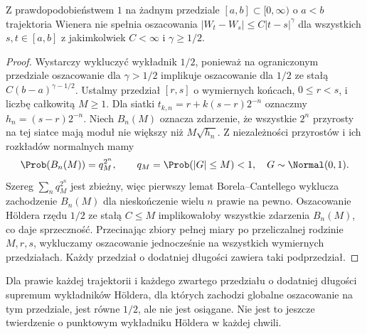 \begin{wniosek}
Z prawdopodobieństwem $1$ na żadnym przedziale
$[a,b]\subset[0,\infty)$ o $a<b$ trajektoria Wienera
nie spełnia oszacowania
$|W_t-W_s|\le C|t-s|^\gamma$ dla wszystkich $s,t\in[a,b]$
z jakimkolwiek $C<\infty$ i $\gamma\ge1/2$.
\end{wniosek}
\begin{proof}
Wystarczy wykluczyć wykładnik $1/2$, ponieważ
na ograniczonym przedziale oszacowanie dla $\gamma>1/2$
implikuje oszacowanie dla $1/2$ ze stałą
$C(b-a)^{\gamma-1/2}$.
Ustalmy przedział $[r,s]$ o wymiernych końcach,
$0\le r<s$, i liczbę całkowitą $M\ge1$.
Dla siatki $t_{k,n}=r+k(s-r)2^{-n}$ oznaczmy
$h_n=(s-r)2^{-n}$. Niech $B_n(M)$ oznacza zdarzenie,
że wszystkie $2^n$ przyrosty na tej siatce mają moduł
nie większy niż $M\sqrt{h_n}$. Z niezależności
przyrostów i ich rozkładów normalnych mamy
\[
\Prob(B_n(M))=q_M^{2^n},\qquad
q_M=\Prob(|G|\le M)<1,\quad G\sim\Normal(0,1).
\]
Szereg $\sum_n q_M^{2^n}$ jest zbieżny,
więc pierwszy lemat Borela--Cantellego wyklucza
zachodzenie $B_n(M)$ dla nieskończenie wielu $n$
prawie na pewno. Oszacowanie H\"oldera rzędu $1/2$
ze stałą $C\le M$ implikowałoby wszystkie zdarzenia
$B_n(M)$, co daje sprzeczność.
Przecinając zbiory pełnej miary po przeliczalnej
rodzinie $M,r,s$, wykluczamy oszacowanie jednocześnie
na wszystkich wymiernych przedziałach. Każdy przedział
o dodatniej długości zawiera taki podprzedział.
\end{proof}

\begin{uwaga}
Dla prawie każdej trajektorii i każdego zwartego
przedziału o dodatniej długości supremum wykładników
H\"oldera, dla których zachodzi globalne oszacowanie
na tym przedziale, jest równe $1/2$, ale nie jest
osiągane. Nie jest to jeszcze twierdzenie o punktowym
wykładniku H\"oldera w każdej chwili.
\end{uwaga}




